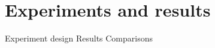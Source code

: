 
\chapter{Experiments and results}\label{chpt:experiments}
Experiment design
Results
Comparisons

\cleardoublepage